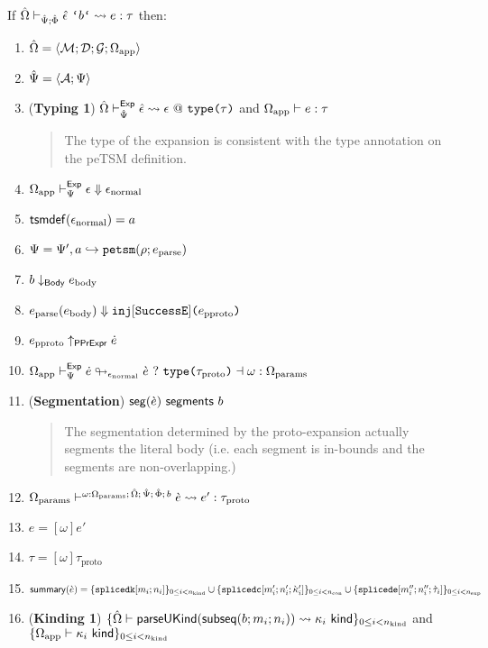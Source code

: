 \begingroup
\def\thetheorem{\ref{thm:petsm-abstract-reasoning-principles}}
\begin{theorem}
If $\expandsP{\uOmega}{\uPsi}{\uPhi}{\utsmap{\uepsilon}{b}}{e}{\tau}$ then:
\begin{enumerate}
	\item ${\hat\Omega}=\langle \mathcal{M}; \mathcal{D}; \mathcal{G}; \Omega_\text{app} \rangle$
	\item $\hat{\Psi}=\langle \mathcal{A}; \Psi \rangle$
	\item (\textbf{Typing 1}) ${\hat\Omega} \vdash_{\hat{\Psi}}^{\mathsf{Exp}} {\hat\epsilon} \leadsto \epsilon~@~\texttt{type}\texttt{(}\tau\texttt{)}$ and $\Omega_\text{app} \vdash e : \tau$
		\begin{quote}
			The type of the expansion is consistent with the type annotation on the peTSM definition.
		\end{quote}
	\item $\Omega_\text{app} \vdash_{\Psi}^\mathsf{Exp} \epsilon \Downarrow \epsilon_\text{normal}$
	\item $\mathsf{tsmdef}(\epsilon_\text{normal})=a$
	\item $\Psi = \Psi', a \hookrightarrow \texttt{petsm}(\rho; e_\text{parse})$
	\item $b \downarrow_\mathsf{Body} e_\text{body}$
  	\item $e_\text{parse}(e_\text{body}) \Downarrow \texttt{inj}[\mathtt{SuccessE}]\texttt{(}e_\text{pproto}\texttt{)}$
	\item $e_\text{pproto} \uparrow_\mathsf{PPrExpr} \dot{e}$
	\item $\Omega_\text{app} \vdash_{\Psi}^\mathsf{Exp} \dot{e} \looparrowright_{\epsilon_\text{normal}} \grave{e} ~?~ \texttt{type}\texttt{(}\tau_\text{proto}\texttt{)} \dashv \omega : \Omega_\text{params}$
	\item (\textbf{Segmentation}) $\mathsf{seg}(\grave{e})~\mathsf{segments}~b$
		\begin{quote}
			The segmentation determined by the proto-expansion actually segments the literal body (i.e. each segment is in-bounds and the segments are non-overlapping.)
		\end{quote}
	\item $\Omega_\text{params} \vdash^{\omega : \Omega_\text{params};\,{\hat\Omega};\,\hat{\Psi};\,\hat\Phi;\,b} \grave{e} \leadsto e' : \tau_\text{proto}$
	\item $e = [\omega]e'$
	\item $\tau = [\omega]\tau_\text{proto}$
	\item $
		\mathsf{summary}(\grave{e}) = \{\texttt{splicedk}[m_i; n_i]\}_{0 \leq i < n_\text{kind}} \cup \{\texttt{splicedc}[m'_i; n'_i; {\grave\kappa}'_i]\}_{0 \leq i < n_\text{con}} \cup\\
					     \{\texttt{splicede}[m''_i; n''_i; \grave{\tau}_i]\}_{0 \leq i < n_\text{exp}}
		$
	\item (\textbf{Kinding 1}) $\{{\hat\Omega} \vdash \mathsf{parseUKind}(\mathsf{subseq}(b; m_i; n_i)) \leadsto \kappa_i~\mathsf{kind}\}_{0 \leq i < n_\text{kind}}$ and $\{\Omega_\text{app} \vdash \kappa_i~\mathsf{kind}\}_{0 \leq i < n_\text{kind}}$

\end{enumerate}
\end{theorem}
